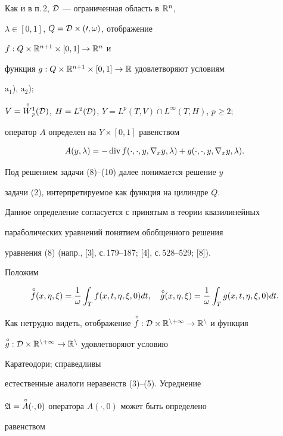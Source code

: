 Как и в п.\,2, $\cal D$ --- ограниченная область в $\Bbb R^n$, 


$\lambda\in[0,1]$, $Q=\cal D\times(0,\omega)$, отображение 


$f:Q\times\Bbb R^{n+1}\times[0,1]\to\Bbb R^n$ и 


функция $g:Q\times\Bbb R^{n+1}\times[0,1]\to\Bbb R$ удовлетворяют условиям 


$\mathrm a_1$), $\mathrm a_2$); 


$V=\up{W}^1_p(\cal D)$, $H=L^2(\cal D)$, $Y=L^p(T,V)\cap 


L^\infty(T,H)$, $p\ge2$; 


оператор $A$ определен на $Y\times[0,1]$ равенством 


$$ 


A(y,\lambda)=-\Div f(\cdot,\cdot,y,\nabla_x y,\lambda)+ 


g(\cdot,\cdot,y,\nabla_x y,\lambda). 


$$ 


Под решением задачи (8)--(10) далее понимается решение $y$ 


задачи (2), интерпретируемое как функция на цилиндре $Q$. 


Данное определение согласуется с принятым в теории квазилинейных 


параболических уравнений понятием обобщенного решения 


уравнения (8) (напр., [3], с.\,179--187; [4], с.\,528--529; [8]). 


 


Положим 


$$ 


\up{f}(x,\eta,\xi)=\frac{1}{\omega}\int_T 


f(x,t,\eta,\xi,0)d t,\quad 


\up{g}(x,\eta,\xi)=\frac{1}{\omega}\int_T g(x,t,\eta,\xi,0)d t. 


$$ 


Как нетрудно видеть, отображение $\up{f}:\cal D\times\Bbb R^{n+1}\to 


\Bbb R^n$ и функция 


$\overset{\,\circ}{g}{}:\cal D\times\Bbb R^{n+1}\to\Bbb R^n$ удовлетворяют условию 


Каратеодори; справедливы 


естественные аналоги неравенств (3)--(5). Усреднение 


$\frak A=\overset{\,\circ}{A}{}(\cdot,0)$ оператора $A(\cdot,0)$ может быть определено 


равенством 


